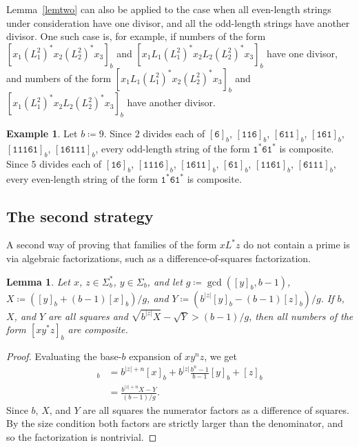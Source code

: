 \documentclass[12pt]{article}
\theoremstyle{plain}
\newtheorem{lemma}[theorem]{Lemma}
\theoremstyle{definition}
\newtheorem{example}[theorem]{Example}
\newcommand{\0}{\mathtt{0}}
\newcommand{\1}{\mathtt{1}}
\newcommand{\2}{\mathtt{2}}
\newcommand{\3}{\mathtt{3}}
\newcommand{\4}{\mathtt{4}}
\newcommand{\5}{\mathtt{5}}
\newcommand{\6}{\mathtt{6}}
\newcommand{\7}{\mathtt{7}}
\newcommand{\8}{\mathtt{8}}
\newcommand{\9}{\mathtt{9}}
\newcommand{\updated}[1]{{\color{red}#1}}
\renewcommand{\updated}[1]{#1}
\begin{document}
Lemma~\ref{lemtwo} can also be applied to the case when all even-length 
strings under consideration have one divisor, and all the odd-length 
strings have another divisor.  One such case is, for example,
if numbers of the form 
$[x_1(L_1^2)^*x_2(L_2^2)^*x_3]_b$ and $[x_1 L_1(L_1^2)^*x_2L_2(L_2^2)^*x_3]_b$ 
have one divisor, and numbers of the form $[x_1L_1(L_1^2)^*x_2(L_2^2)^*x_3]_b$ 
and $[x_1(L_1^2)^*x_2L_2(L_2^2)^*x_3]_b$ have another divisor.
\begin{example}
Let $b \coloneqq 9$.
Since $2$ divides each of $[\6]_b$,
$[\1\1\6]_b$,
$[\6\1\1]_b$,
$[\1\6\1]_b$,
$[\1\1\1\6\1]_b$, 
$[\1\6\1\1\1]_b$, every odd-length string of the form $\1^*\6\1^*$ is 
composite.
Since $5$ divides each of $[\1\6]_b$,
$[\1\1\1\6]_b$,
$[\1\6\1\1]_b$,
$[\6\1]_b$,
$[\1\1\6\1]_b$, 
$[\6\1\1\1]_b$,
every even-length string of the form $\1^*\6\1^*$ is composite.
\end{example}

\subsection{The second strategy}

A second way of proving that families of the form $xL^*z$ do not contain a 
prime is via algebraic factorizations, such as a difference-of-squares 
factorization.

\begin{lemma}\label{lemsquares}
Let\/ $x$, $z\in\Sigma^*_b$, \updated{$y\in\Sigma_b$}, and let\/ $g\coloneqq\gcd([y]_b,b-1)$, 
$X\coloneqq([y]_b+(b-1)[x]_b)/g$, and\/ $Y\coloneqq(b^{\lvert{z}\rvert}[y]_b-(b-1)[z]_b)/g$.
If\/ $b$, $X$, and\/ $Y$ are all squares and\/ 
$\sqrt{b^{\lvert z\rvert}X}-\sqrt{Y}>(b-1)/g$, then all numbers of the form\/
 $[xy^*z]_b$ are composite.
\end{lemma}
\begin{proof}
Evaluating the base-$b$ expansion of $xy^nz$, we get
\begin{align*}
[xy^nz]_b &= b^{\lvert z\rvert+n}[x]_b + b^{\lvert z\rvert}\frac{b^n-1}{b-1}[y]_b + [z]_b \\
&= \frac{b^{\lvert z\rvert+n}X-Y}{(b-1)/g} . 
\end{align*}
Since $b$, $X$, and $Y$ are all squares the numerator factors as a 
difference of squares.  By the size condition both factors are 
strictly larger than the
denominator, and so the factorization is nontrivial.
\end{proof}
\end{document}
